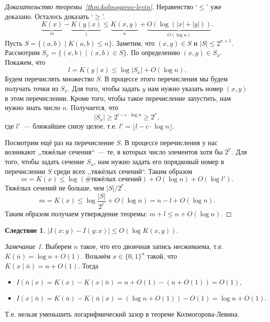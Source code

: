 \documentclass[12pt]{article}
\theoremstyle{definition}
\theoremstyle{plain}
\newtheorem{corollary}{Следствие}[section]
\theoremstyle{remark}
\newtheorem{remark}{Замечание}[section]
\begin{document}
\begin{proof}[Доказательство теоремы~\ref{thm:kolmogorov-levin}] Неравенство `$\le$' уже
    доказано. Осталось доказать `$\ge$'.
    \[
    \underbrace{K(x)}_{m} - \underbrace{K(y\mid x)}_l \le \underbrace{K(x,y)}_n
    + \underbrace{O(\log(|x| + |y|))}_{O(\log n)}.
    \]
    Пусть $S = \{( a,b) \mid K(a,b)\le n\}$. Заметим, что $(
    x,y)\in S$ и $|S|\le 2^{n+1}$. 
    Рассмотрим $S_x = \{( x,b) \mid ( x,b) \in S\}$.
    По определению $( x,y)\in S_x$.
    Покажем, что 
    \[
        l = K(y\mid x)\le \log|S_x| + O(\log n).
    \]
    Будем перечислять множество $S$. В процессе этого перечисления мы будем
    получать точки из $S_x$. Для того, чтобы задать $y$ нам нужно указать
    номер $( x,y )$ в этом перечислении. Кроме того, чтобы такое
    перечисление запустить, нам нужно знать число $n$. Получается, что
    \[|S_x| \ge 2^{l - c\cdot\log n} \ge 2^{l'},\]
    где $l'$~--- ближайшее снизу целое, т.е. $l' = \lfloor l - c\cdot\log n\rfloor$.

    Посмотрим ещё раз на перечисление $S$. В процессе перечисления у нас
    возникают ,,тяжёлые сечения``~--- те, в которых число элементов хотя бы
    $2^{l'}$. Для того, чтобы задать сечение $S_x$, нам нужно задать его
    порядковый номер в перечислении $S$ среди всех ,,тяжёлых сечений``. Таким
    образом
    \[
        m = K(x) \le \log(\text{\# тяжёлых сечений}) + O(\log n) + O(\log l').
    \]
    Тяжёлых сечений не больше, чем $|S|/2^{l'}$.
    \[
        m = K(x) \le \log\frac{|S|}{2^{l'}} + O(\log n) = n - l + O(\log n).
    \]
    Таким образом получаем утверждение теоремы: $m + l \le n + O(\log n)$.
\end{proof}
\begin{corollary}
    $|I(x:y) - I(y:x)|\le O(\log K(x,y)).$
\end{corollary}
\begin{remark}
    Выберем $n$ такое, что его двоичная запись несжимаема, 
    т.е. $K(\bar n) = \log n + O(1)$. Возьмём $x\in\{0,1\}^n$ такой, что
    $K(x\mid \bar n) = n + O(1).$ Тогда
    \begin{itemize}
    \item\(
        I(\bar n\mid x) = K(x) - K(x\mid\bar n) = n + O(1) - (n + O(1)) = O(1),
    \)
    \item\(
        I(x\mid\bar n) = K(\bar n) - K(\bar n\mid x) = (\log n + O(1)) - O(1) = \log n + O(1).
    \)
    \end{itemize}
    Т.е. нельзя уменьшить логарифмический зазор в теореме Колмогорова-Левина.
\end{remark}
\end{document}
